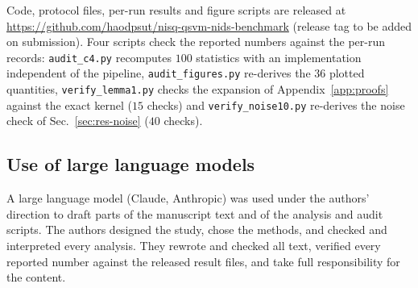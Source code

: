 Code, protocol files, per-run results and figure scripts are released at
\url{https://github.com/haodpsut/nisq-qsvm-nids-benchmark} (release tag to be added on
submission). Four scripts check the reported numbers against the per-run records:
\texttt{audit\_c4.py} recomputes $100$ statistics with an implementation independent of the
pipeline, \texttt{audit\_figures.py} re-derives the $36$ plotted quantities,
\texttt{verify\_lemma1.py} checks the expansion of Appendix~\ref{app:proofs} against the exact
kernel ($15$ checks) and \texttt{verify\_noise10.py} re-derives the noise check of
Sec.~\ref{sec:res-noise} ($40$ checks).

\subsection{Use of large language models}\label{sec:llm}

A large language model (Claude, Anthropic) was used under the authors' direction to draft parts
of the manuscript text and of the analysis and audit scripts. The authors designed the study,
chose the methods, and checked and interpreted every analysis. They rewrote and checked all
text, verified every reported number against the released result files, and take full
responsibility for the content.

